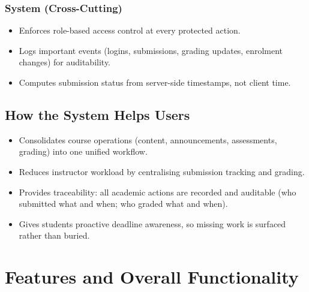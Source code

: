 \documentclass[12pt, a4paper]{article}
\begin{document}
\subsubsection*{System (Cross-Cutting)}
\begin{itemize}
  \item Enforces role-based access control at every protected action.
  \item Logs important events (logins, submissions, grading updates, enrolment changes) for auditability.
  \item Computes submission status from server-side timestamps, not client time.
\end{itemize}

\subsection{How the System Helps Users}
\begin{itemize}
  \item Consolidates course operations (content, announcements, assessments, grading) into one unified workflow.
  \item Reduces instructor workload by centralising submission tracking and grading.
  \item Provides traceability: all academic actions are recorded and auditable (who submitted what and when; who graded what and when).
  \item Gives students proactive deadline awareness, so missing work is surfaced rather than buried.
\end{itemize}

\section{Features and Overall Functionality}
\end{document}
